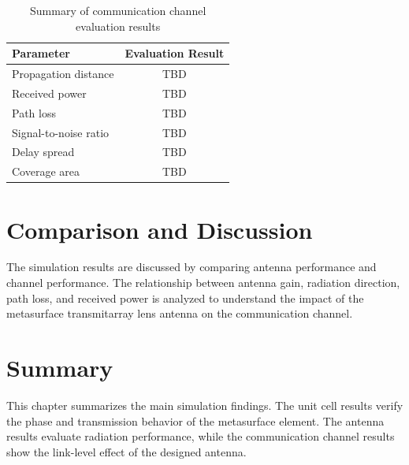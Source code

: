 \begin{table}[h!]
	\begin{center}
		\caption{Summary of communication channel evaluation results}
		\label{table:channel_results}
		\begin{tabular}{|l|c|}
			\hline
			\textbf{Parameter} & \textbf{Evaluation Result} \\
			\hline
			Propagation distance & TBD \\
			Received power & TBD \\
			Path loss & TBD \\
			Signal-to-noise ratio & TBD \\
			Delay spread & TBD \\
			Coverage area & TBD \\
			\hline
		\end{tabular}
	\end{center}
\end{table}

\section{Comparison and Discussion}
The simulation results are discussed by comparing antenna performance and channel performance. The relationship between antenna gain, radiation direction, path loss, and received power is analyzed to understand the impact of the metasurface transmitarray lens antenna on the communication channel.

\section{Summary}
This chapter summarizes the main simulation findings. The unit cell results verify the phase and transmission behavior of the metasurface element. The antenna results evaluate radiation performance, while the communication channel results show the link-level effect of the designed antenna.
